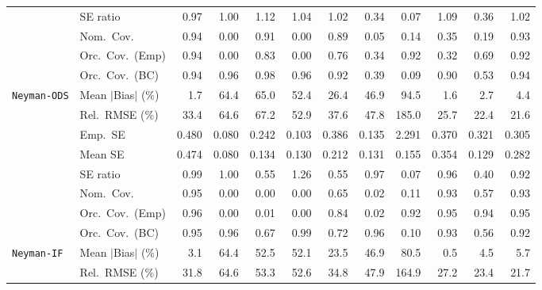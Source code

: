 \begin{landscape}
\begin{longtable}{llrrrrrrrrrr}
 & SE ratio & 0.97 & \cellcolor{rankone}1.00 & 1.12 & 1.04 & \cellcolor{ranktwo}1.02 & 0.34 & 0.07 & 1.09 & 0.36 & \cellcolor{rankthree}1.02 \\
 & Nom.\ Cov. & \cellcolor{rankone}0.94 & 0.00 & \cellcolor{rankthree}0.91 & 0.00 & 0.89 & 0.05 & 0.14 & 0.35 & 0.19 & \cellcolor{ranktwo}0.93 \\
 & Orc.\ Cov.\ (Emp) & \cellcolor{rankone}0.94 & 0.00 & 0.83 & 0.00 & 0.76 & 0.34 & \cellcolor{rankthree}0.92 & 0.32 & 0.69 & \cellcolor{ranktwo}0.92 \\
 & Orc.\ Cov.\ (BC) & \cellcolor{rankone}0.94 & \cellcolor{ranktwo}0.96 & 0.98 & 0.96 & 0.92 & 0.39 & 0.09 & 0.90 & 0.53 & \cellcolor{rankthree}0.94 \\
\addlinespace[2pt]
\quad \texttt{Neyman-ODS} & Mean $|$Bias$|$ (\%) & \cellcolor{ranktwo}1.7 & 64.4 & 65.0 & 52.4 & 26.4 & 46.9 & 94.5 & \cellcolor{rankone}1.6 & \cellcolor{rankthree}2.7 & 4.4 \\
 & Rel.\ RMSE (\%) & 33.4 & 64.6 & 67.2 & 52.9 & 37.6 & 47.8 & 185.0 & \cellcolor{rankthree}25.7 & \cellcolor{ranktwo}22.4 & \cellcolor{rankone}21.6 \\
 & Emp.\ SE & 0.480 & 0.080 & 0.242 & 0.103 & 0.386 & 0.135 & 2.291 & 0.370 & 0.321 & 0.305 \\
 & Mean SE & 0.474 & 0.080 & 0.134 & 0.130 & 0.212 & 0.131 & 0.155 & 0.354 & 0.129 & 0.282 \\
 & SE ratio & \cellcolor{ranktwo}0.99 & \cellcolor{rankone}1.00 & 0.55 & 1.26 & 0.55 & \cellcolor{rankthree}0.97 & 0.07 & 0.96 & 0.40 & 0.92 \\
 & Nom.\ Cov. & \cellcolor{rankone}0.95 & 0.00 & 0.00 & 0.00 & 0.65 & 0.02 & 0.11 & \cellcolor{ranktwo}0.93 & 0.57 & \cellcolor{rankthree}0.93 \\
 & Orc.\ Cov.\ (Emp) & \cellcolor{rankthree}0.96 & 0.00 & 0.01 & 0.00 & 0.84 & 0.02 & 0.92 & \cellcolor{rankone}0.95 & 0.94 & \cellcolor{ranktwo}0.95 \\
 & Orc.\ Cov.\ (BC) & \cellcolor{rankone}0.95 & \cellcolor{ranktwo}0.96 & 0.67 & 0.99 & 0.72 & \cellcolor{rankthree}0.96 & 0.10 & 0.93 & 0.56 & 0.92 \\
\addlinespace[2pt]
\quad \texttt{Neyman-IF} & Mean $|$Bias$|$ (\%) & \cellcolor{ranktwo}3.1 & 64.4 & 52.5 & 52.1 & 23.5 & 46.9 & 80.5 & \cellcolor{rankone}0.5 & \cellcolor{rankthree}4.5 & 5.7 \\
 & Rel.\ RMSE (\%) & 31.8 & 64.6 & 53.3 & 52.6 & 34.8 & 47.9 & 164.9 & \cellcolor{rankthree}27.2 & \cellcolor{ranktwo}23.4 & \cellcolor{rankone}21.7 \\

\end{longtable}
\end{landscape}
